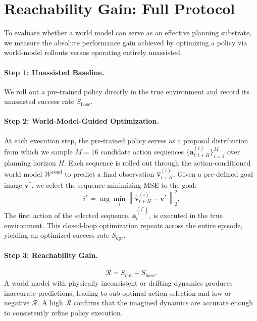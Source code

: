 \documentclass{article}
\begin{document}
\section{Reachability Gain: Full Protocol}
\label{app:reachability}
 
To evaluate whether a world model can serve as an effective planning substrate, we measure the absolute performance gain achieved by optimizing a policy via world-model rollouts versus operating entirely unassisted.
 
\paragraph{Step 1: Unassisted Baseline.}
We roll out a pre-trained policy directly in the true environment and record its unassisted success rate $S_{\text{base}}$.
 
\paragraph{Step 2: World-Model-Guided Optimization.}
At each execution step, the pre-trained policy serves as a proposal distribution from which we sample $M=16$ candidate action sequences $\{\mathbf{a}_{t:t+H}^{(i)}\}_{i=1}^M$ over planning horizon $H$. Each sequence is rolled out through the action-conditioned world model $\mathcal{W}^{\text{cond}}$ to predict a final observation $\hat{\mathbf{v}}_{t+H}^{(i)}$. Given a pre-defined goal image $\mathbf{v}^*$, we select the sequence minimizing MSE to the goal:
\begin{equation}
    i^* = \arg\min_{i} \left\| \hat{\mathbf{v}}_{t+H}^{(i)} - \mathbf{v}^* \right\|_2^2.
\end{equation}
The first action of the selected sequence, $\mathbf{a}_t^{(i^*)}$, is executed in the true environment. This closed-loop optimization repeats across the entire episode, yielding an optimized success rate $S_{\text{opt}}$.
 
\paragraph{Step 3: Reachability Gain.}
\begin{equation}
    \mathcal{R} = S_{\text{opt}} - S_{\text{base}}.
\end{equation}
A world model with physically inconsistent or drifting dynamics produces inaccurate predictions, leading to sub-optimal action selection and low or negative $\mathcal{R}$. A high $\mathcal{R}$ confirms that the imagined dynamics are accurate enough to consistently refine policy execution.
\end{document}

